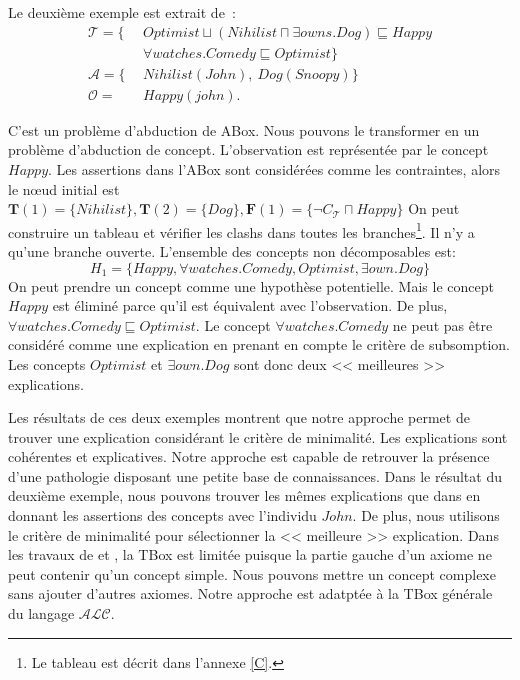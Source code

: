 \documentclass{article}
\begin{document}
\medskip

Le deuxième exemple est extrait de~\cite{klarman2011abox}:\vspace{-0.25cm}
\begin{align*}
 \mathcal{T}=\{~~&Optimist \sqcup (Nihilist\sqcap \exists owns.Dog)\sqsubseteq Happy\\
~~&\forall watches.Comedy \sqsubseteq Optimist \}\\ 
\mathcal{A}=\{~~&Nihilist(John),~Dog(Snoopy)\}\\
\mathcal{O}=~~~~~&Happy(john).
\end{align*}

C'est un problème d'abduction de ABox. Nous pouvons le transformer en un problème d'abduction de concept.
L'observation est représentée par le concept $Happy$.
Les assertions dans l'ABox sont considérées comme les contraintes, 
alors le n{\oe}ud initial est $\mathbf{T}(1)=\{Nihilist\},\mathbf{T}(2)=\{Dog\}, \mathbf{F}(1)=\{\neg C_\mathcal{T}\sqcap Happy\}$
On peut construire un tableau et vérifier les clashs dans toutes les branches\footnote{Le tableau est décrit dans l'annexe \ref{C}.}. Il n'y a qu'une branche ouverte. L'ensemble des concepts non décomposables est:\vspace{-0.2cm}
$$H_1=\{Happy, \forall watches.Comedy, Optimist, \exists own.Dog\}$$
On peut prendre un concept comme une hypothèse potentielle. Mais le concept $Happy$ est éliminé parce qu'il est équivalent avec l'observation. De plus, $\forall watches.Comedy \sqsubseteq Optimist$. Le concept $\forall watches.Comedy$ ne peut pas être considéré comme une explication en prenant en compte le critère de subsomption. 
Les concepts $Optimist$ et $ \exists own.Dog$ sont donc deux << meilleures >> explications.

Les résultats de ces deux exemples montrent que notre approche permet de trouver une explication considérant 
le critère de minimalité. Les explications sont cohérentes et explicatives.  Notre approche est capable de
retrouver la présence d'une pathologie disposant une petite base de connaissances. Dans le  résultat du deuxième 
exemple, nous pouvons trouver les mêmes explications que dans \cite{klarman2011abox} en donnant les assertions des concepts
avec l'individu $John$. De plus, nous utilisons le critère de minimalité pour sélectionner la << meilleure >> explication.
Dans les travaux de \cite{colucci2004uniform} et \cite{EKMRMW07},  la TBox est limitée puisque la partie gauche d'un axiome ne peut contenir qu'un concept simple. Nous pouvons mettre un concept complexe  sans ajouter d'autres axiomes.
Notre approche est adatptée à la TBox générale du langage $\mathcal{ALC}$.
\end{document}
